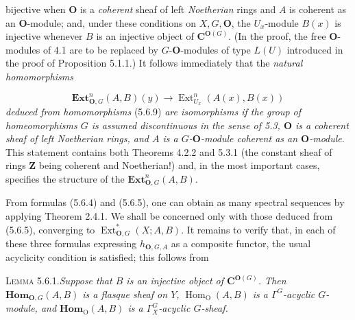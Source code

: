 \clearpage
{}

\noindent bijective when ${\mathbf O}$ is a \textit{coherent} sheaf of left
\textit{Noetherian} rings and $A$ is coherent as an ${\mathbf O}$-module; and, under
these conditions on $X,G,{\mathbf O}$, the $U_x$-module $B(x)$ is injective whenever $B$
is an injective object of ${\mathbf C}^{{\mathbf O}(G)}$. (In the proof, the free ${\mathbf O}$-modules of
4.1 are to be replaced by $G$-${\mathbf O}$-modules of type $L(U)$ introduced in the
proof of Proposition 5.1.1.) It follows immediately that the \textit{natural
homomorphisms}

\[
\tag{5.6.10}
\mathbf{Ext}_{{\mathbf O},G}^n(A,B)(y)
\to \operatorname{Ext}_{U_x}^n(A(x),B(x))
\]
\textit{deduced from homomorphisms} (5.6.9) \textit{are
isomorphisms if the group of homeomorphisms $G$ is assumed discontinuous in
the sense of \textup{5.3}, ${\mathbf O}$ is a coherent sheaf of left Noetherian rings, and $A$ is
a $G$-${\mathbf O}$-module coherent as an ${\mathbf O}$-module}. This statement contains both
Theorems 4.2.2 and 5.3.1 (the constant sheaf of rings $\mathbf Z$ being
coherent and Noetherian!) and, in the most important cases, specifies the
structure of the $\mathbf{Ext}_{{\mathbf O},G}^n(A,B)$.

From formulas (5.6.4) and (5.6.5), one can obtain as many spectral sequences
by applying Theorem 2.4.1. We shall be concerned only with those deduced from
(5.6.5), converging to $\operatorname{Ext}_{{\mathbf O},G}^{*}(X;A,B)$. It remains to
verify that, in each of these three formulas expressing $h_{{\mathbf O},G,A}$ as a
composite functor, the usual acyclicity condition is satisfied; this follows
from

\textsc{Lemma 5.6.1.}\quad \textit{Suppose that $B$ is an injective
object of ${\mathbf C}^{{\mathbf O}(G)}$. Then $\mathbf{Hom}_{{\mathbf O},G}(A,B)$ is a flasque sheaf on $Y$,
$\operatorname{Hom}_{\mathrm O}(A,B)$ is a $\Gamma^G$-acyclic $G$-module, and
$\mathbf{Hom}_{\mathrm O}(A,B)$ is a $\Gamma_X^G$-acyclic $G$-sheaf.}


